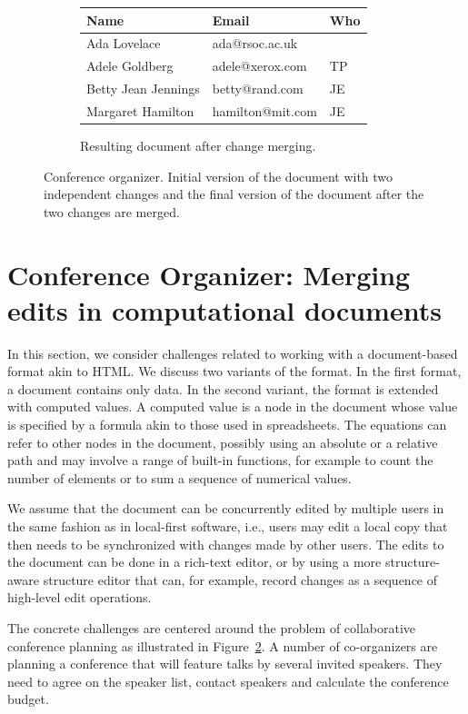 \documentclass[english,submission]{programming}
\begin{document}
\begin{figure}
\begin{adjustwidth}{-5.5em}{-5.5em}
\begin{subfigure}[b]{23em}
{{   \begin{tabular}{| l | l | l |}
     \hline
     \textbf{Name} & \textbf{Email} & \textbf{Who} \\
     \hline \hline
     Ada Lovelace & ada@rsoc.ac.uk & \\
     \hline
     Adele Goldberg & adele@xerox.com & TP\\
     \hline
     Betty Jean Jennings & betty@rand.com & JE\\
     \hline
     Margaret Hamilton & hamilton@mit.com & JE\\
     \hline
   \end{tabular}
   }}
   \caption{Resulting document after change merging.}
   \label{fig:conf-fin}
\end{subfigure}
\end{adjustwidth}
\vspace{0.5em}
\caption{Conference organizer. Initial version of the document with two independent changes
and the final version of the document after the two changes are merged.}
\label{fig:conf}
\vspace{0.5em}
\end{figure}


\section{Conference Organizer: Merging edits in computational documents}
In this section, we consider challenges related to working with a document-based format akin to HTML.
We discuss two variants of the format. In the first format, a document
contains only data. In the second variant, the format is extended with computed values.
A computed value is a node in the document whose value is specified by a formula akin to those
used in spreadsheets. The equations can refer to other nodes in the document, possibly using
an absolute or a relative path and may involve a range of built-in functions, for example to
count the number of elements or to sum a sequence of numerical values.

We assume that the document can be
concurrently edited by multiple users in the same fashion as in local-first software, i.e.,
users may edit a local copy that then needs to be synchronized with changes made by other users.
The edits to the document can be done in a rich-text editor, or by using a more structure-aware
structure editor that can, for example, record changes as a sequence of high-level edit operations.

The concrete challenges are centered around the problem of collaborative conference planning
as illustrated in Figure~\ref{fig:conf}. A number of co-organizers are planning a conference
that will feature talks by several invited speakers. They need to agree on the speaker list,
contact speakers and calculate the conference budget.
\end{document}
